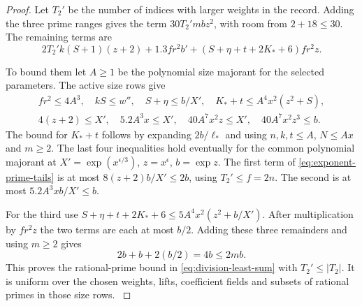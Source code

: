 \begin{proof}
Let \(T_2'\) be the number of indices with larger weights in the record.
Adding the three prime ranges gives the term
\(30T_2' mbz^2\), with room from \(2+18\le30\). The remaining
terms are
\begin{equation}\label{eq:exponent-prime-tails}
 2T_2' k(S+1)(z+2)+1.3 f r^2 b'
       +(S+\eta+t+2K_*+6) f r^2 z .
\end{equation}

To bound them let \(A\ge1\) be the polynomial size majorant
for the selected parameters. The active size rows give
\[
 \begin{gathered}
 f r^2\le4A^3,\quad kS\le w'',\quad S+\eta\le b/X',\quad
 K_*+t\le A^4x^2(z^2+S),\\
 4(z+2)\le X',\quad 5.2A^3x\le X',\quad
 40 A^7x^2 z\le X',\quad 40 A^7x^2 z^3\le b .
 \end{gathered}
\]
The bound for \(K_*+t\) follows by expanding \(2b/\ell_*\)
and using \(n,k,t\le A\), \(N\le Ax\) and \(m\ge2\).
The last four inequalities hold eventually for the common
polynomial majorant at \(X'=\exp(x^{\epsilon/3})\),
\(z=x^\epsilon\), \(b=\exp z\). The first term of
\eqref{eq:exponent-prime-tails} is at most
\(8(z+2)b/X'\le2b\), using \(T_2'\le f=2n\).
The second is at most \(5.2A^3xb/X'\le b\).

For the third use
\(S+\eta+t+2K_*+6\le5A^4x^2(z^2+b/X')\).
After multiplication by \(fr^2z\) the two terms are each
at most \(b/2\). Adding these three remainders and using \(m\ge2\) gives
\[
 2b+b+2(b/2)=4b\le 2mb .
\] This proves the rational-prime bound in
\eqref{eq:division-least-sum} with \(T_2'\le|T_2|\).
It is uniform over the chosen weights, lifts, coefficient fields
and subsets of rational primes in those size rows.
\label{cor:lift-exponent-primes-5}
\end{proof}
